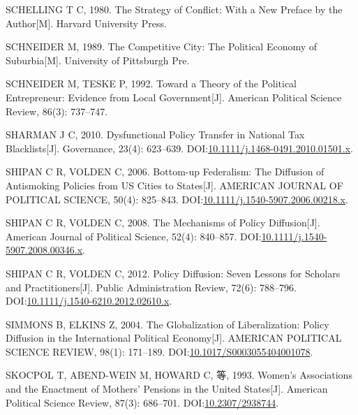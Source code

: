 \documentclass[
  12pt,
]{ctexart}
\newlength{\cslhangindent}
\newlength{\cslentryspacingunit} %
\newenvironment{CSLReferences}[2] %
 {%
  \setlength{\parindent}{0pt}
  \ifodd #1
  \let\oldpar\par
  \def\par{\hangindent=\cslhangindent\oldpar}
  \fi
  \setlength{\parskip}{#2\cslentryspacingunit}
 }%
 {}
\begin{document}
\begin{CSLReferences}{1}{0}
\leavevmode{}%
SCHELLING T C, 1980. The {Strategy} of {Conflict}: {With} a {New Preface} by the {Author}{[}M{]}. {Harvard University Press}.

\leavevmode{}%
SCHNEIDER M, 1989. The Competitive City: {The} Political Economy of Suburbia{[}M{]}. {University of Pittsburgh Pre}.

\leavevmode{}%
SCHNEIDER M, TESKE P, 1992. Toward a Theory of the Political Entrepreneur: Evidence from Local Government{[}J{]}. American Political Science Review, 86(3): 737--747.

\leavevmode{}%
SHARMAN J C, 2010. Dysfunctional {Policy Transfer} in {National Tax Blacklists}{[}J{]}. Governance, 23(4): 623--639. DOI:\href{https://doi.org/10.1111/j.1468-0491.2010.01501.x}{10.1111/j.1468-0491.2010.01501.x}.

\leavevmode{}%
SHIPAN C R, VOLDEN C, 2006. Bottom-up Federalism: {The} Diffusion of Antismoking Policies from {US} Cities to States{[}J{]}. AMERICAN JOURNAL OF POLITICAL SCIENCE, 50(4): 825--843. DOI:\href{https://doi.org/10.1111/j.1540-5907.2006.00218.x}{10.1111/j.1540-5907.2006.00218.x}.

\leavevmode{}%
SHIPAN C R, VOLDEN C, 2008. The {Mechanisms} of {Policy Diffusion}{[}J{]}. American Journal of Political Science, 52(4): 840--857. DOI:\href{https://doi.org/10.1111/j.1540-5907.2008.00346.x}{10.1111/j.1540-5907.2008.00346.x}.

\leavevmode{}%
SHIPAN C R, VOLDEN C, 2012. Policy {Diffusion}: {Seven Lessons} for {Scholars} and {Practitioners}{[}J{]}. Public Administration Review, 72(6): 788--796. DOI:\href{https://doi.org/10.1111/j.1540-6210.2012.02610.x}{10.1111/j.1540-6210.2012.02610.x}.

\leavevmode{}%
SIMMONS B, ELKINS Z, 2004. The Globalization of Liberalization: {Policy} Diffusion in the International Political Economy{[}J{]}. AMERICAN POLITICAL SCIENCE REVIEW, 98(1): 171--189. DOI:\href{https://doi.org/10.1017/S0003055404001078}{10.1017/S0003055404001078}.

\leavevmode{}%
SKOCPOL T, ABEND-WEIN M, HOWARD C, 等, 1993. Women's {Associations} and the {Enactment} of {Mothers}' {Pensions} in the {United States}{[}J{]}. American Political Science Review, 87(3): 686--701. DOI:\href{https://doi.org/10.2307/2938744}{10.2307/2938744}.


\end{CSLReferences}
\end{document}
